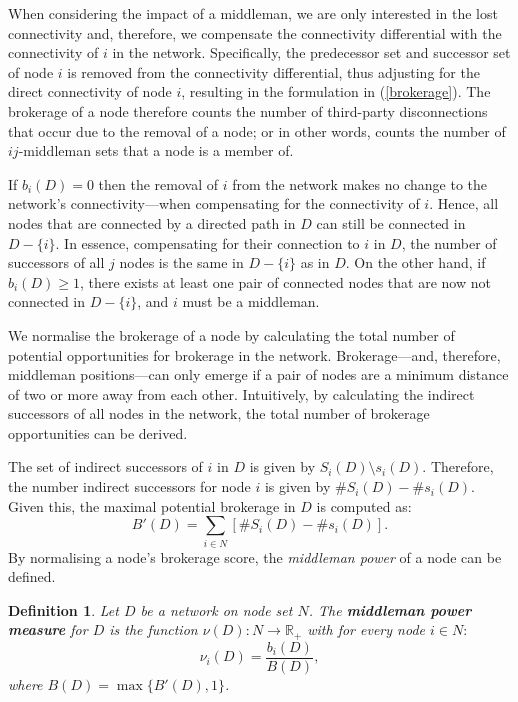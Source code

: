 \documentclass[11pt,fleqn]{article}
\newtheorem{definition}[theorem]{Definition}
\begin{document}
When considering the impact of a middleman, we are only interested in the lost connectivity and, therefore, we compensate the connectivity differential with the connectivity of $i$ in the network. Specifically, the predecessor set and successor set of node $i$ is removed from the connectivity differential, thus adjusting for the direct connectivity of node $i$, resulting in the formulation in (\ref{brokerage}). The brokerage of a node therefore counts the number of third-party disconnections that occur due to the removal of a node; or in other words, counts the number of $ij$-middleman sets that a node is a member of.

If $b_{i}(D) = 0$ then the removal of $i$ from the network makes no change to the network's connectivity---when compensating for the connectivity of $i$. Hence, all nodes that are connected by a directed path in $D$ can still be connected in $D - \{i\}$. In essence, compensating for their connection to $i$ in $D$, the number of successors of all $j$ nodes is the same in $D - \{i\}$ as in $D$. On the other hand, if $b_{i}(D) \geqslant 1$, there exists at least one pair of connected nodes that are now not connected in $D - \{i\}$, and $i$ must be a middleman.

\medskip\noindent
We normalise the brokerage of a node by calculating the total number of potential opportunities for brokerage in the network. Brokerage---and, therefore, middleman positions---can only emerge if a pair of nodes are a minimum distance of two or more away from each other. Intuitively, by calculating the indirect successors of all nodes in the network, the total number of brokerage opportunities can be derived.

The set of indirect successors of $i$ in $D$ is given by $S_{i}(D) \setminus s_{i}(D)$. Therefore, the number indirect successors for node $i$ is given by $\# S_{i}(D) - \# s_{i}(D)$. Given this, the maximal potential brokerage in $D$ is computed as:
\begin{equation} \label{normalisation}
B'(D) = \sum_{i \in N} \left[ \# S_{i}(D) - \# s_{i}(D) \right] .
\end{equation}
By normalising a node's brokerage score, the \emph{middleman power} of a node can be defined.

\begin{definition} \label{middlemanpower}
Let $D$ be a network on node set $N$. The \textbf{middleman power measure} for $D$ is the function $\nu (D) \colon N \to \mathbb{R}_+$ with for every node $i \in N \colon$
\begin{equation} \label{mmpowerindex}
\nu_{i}(D) = \frac{b_{i}(D)}{B(D)} ,
\end{equation}
where $B(D) = \max \{ B'(D) , 1 \}$.
\end{definition}
\end{document}
